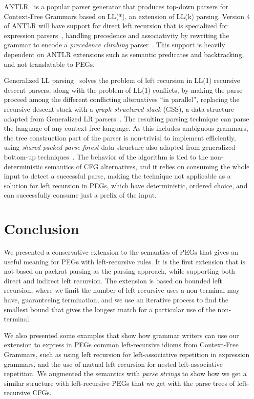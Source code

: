 ANTLR~\cite{parr:antlrpldi} is a popular
parser generator that produces top-down parsers for Context-Free
Grammars based on LL(*), an extension of LL(k) parsing. Version 4 of
ANTLR will have support for direct left recursion that is specialized
for expression parsers~\cite{antlr:left}, handling precedence and associativity by
rewriting the grammar to encode a {\em precedence climbing}
parser~\cite{hanson:prec}. This support is heavily dependent on ANTLR
extensions such as semantic predicates and backtracking, and not translatable to PEGs.

Generalized LL parsing~\cite{scott:glltree,scott:gll} solves the problem of
left recursion in LL(1) recursive descent parsers, along with the problem of
LL(1) conflicts, by making the parse proceed among the different conflicting
alternatives ``in parallel'', replacing the recursive descent stack with a
{\em graph structured stack} (GSS), a data structure adapted from Generalized LR
parsers~\cite{tomita:gss}. The resulting parsing technique can parse the language of
any context-free language. As this includes ambiguous grammars, the tree construction
part of the parser is non-trivial to implement efficiently, using {\em shared packed parse forest}
data structure also adapted from generalized bottom-up techniques~\cite{scott:brnglr}.
 The behavior of the algorithm is tied to the non-deterministic
semantics of CFG alternatives, and it relies on consuming the whole input to
detect a successful parse, making the technique not applicable as a solution for left recursion
in PEGs, which have deterministic, ordered choice, and can successfully consume just
a prefix of the input.

\section{Conclusion}
\label{sec:con}

We presented a conservative extension to the semantics of PEGs that
gives an useful meaning for PEGs with left-recursive rules. It is
the first extension that is not based on packrat parsing as the
parsing approach, while supporting both direct and indirect left
recursion. The extension is based on bounded left recursion, where we
limit the number of left-recursive uses a non-terminal may have,
guaranteeing termination, and we use an iterative process to find the
smallest bound that gives the longest match for a particular use of
the non-terminal.

We also presented some examples that show how grammar writers can use
our extension to express in PEGs common left-recursive idioms from
Context-Free Grammars, such as using left recursion for
left-associative repetition in expression grammars, and the use of
mutual left recursion for nested left-associative repetition. We
augmented the semantics with {\em parse strings} to show how we get a
similar structure with left-recursive PEGs that we get with the parse
trees of left-recursive CFGs.

